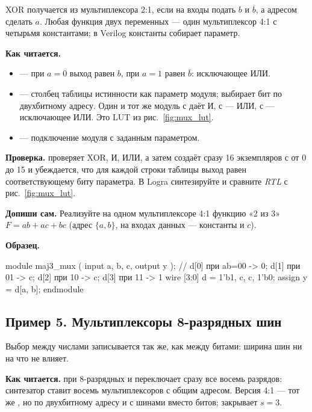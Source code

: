 XOR получается из мультиплексора 2:1, если на входы подать $b$ и $\overline{b}$,
а адресом сделать $a$. Любая функция двух переменных --- один мультиплексор 4:1
с четырьмя константами; в Verilog константы собирает параметр.


\textbf{Как читается.}
\begin{itemize}
  \item {} --- при $a=0$ выход равен $b$, при $a=1$ равен $\overline b$: исключающее ИЛИ.
  \item {} --- столбец таблицы истинности как параметр модуля;  выбирает бит по двухбитному адресу. Один и тот же модуль с  даёт И, с  --- ИЛИ, с  --- исключающее ИЛИ. Это LUT из рис.~\ref{fig:mux_lut}.
  \item {} --- подключение модуля с заданным параметром.
\end{itemize}
\textbf{Проверка.}  проверяет XOR, И, ИЛИ, а затем создаёт
сразу 16 экземпляров с  от 0 до 15 и убеждается, что для каждой строки
таблицы выход равен соответствующему биту параметра. В Logra синтезируйте
 и сравните \emph{RTL} с рис.~\ref{fig:mux_lut}.

\textbf{Допиши сам.} Реализуйте на одном мультиплексоре 4:1 функцию «2 из 3»
$F=ab+ac+bc$ (адрес $\{a,b\}$, на входах данных --- константы и $c$).

\textbf{Образец.}
\begin{vcode}
module maj3_mux (
    input  a, b, c,
    output y
);
    // d[0] при ab=00 -> 0;  d[1] при 01 -> c;  d[2] при 10 -> c;  d[3] при 11 -> 1
    wire [3:0] d = {1'b1, c, c, 1'b0};
    assign y = d[{a, b}];
endmodule
\end{vcode}

\subsection{Пример 5. Мультиплексоры 8-разрядных шин}

Выбор между числами записывается так же, как между битами: ширина шин ни на что
не влияет.


\textbf{Как читается.}  при 8-разрядных  и 
переключает сразу все восемь разрядов: синтезатор ставит восемь мультиплексоров
с общим адресом. Версия 4:1 --- тот же , но по двухбитному адресу
и с шинами вместо битов;  закрывает $s=3$.

